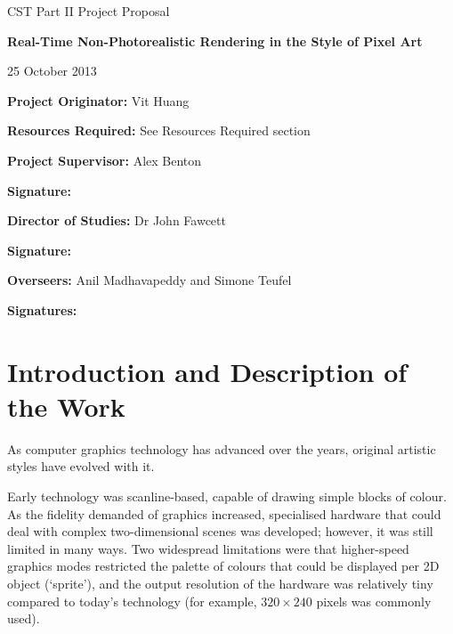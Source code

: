 \documentclass[12pt]{article}
\begin{document}
\thispagestyle{empty}

\medskip
{}
\medskip
{}

\vfil

\centerline{\large CST Part II Project Proposal}
\vspace{0.4in}
\centerline{\Large\bf Real-Time Non-Photorealistic Rendering in the Style of Pixel Art}
\vspace{0.3in}
\centerline{\large 25 October 2013}

\vfil

{\bf Project Originator:} Vit Huang

\vspace{0.1in}

{\bf Resources Required:} See Resources Required section

\vspace{0.5in}

{\bf Project Supervisor:} Alex Benton

\vspace{0.2in}

{\bf Signature:}

\vspace{0.5in}

{\bf Director of Studies:} Dr John Fawcett

\vspace{0.2in}

{\bf Signature:}

\vspace{0.5in}

{\bf Overseers:} Anil Madhavapeddy and Simone Teufel

\vspace{0.2in}

{\bf Signatures:}

\vfil
\eject


\section*{Introduction and Description of the Work}

As computer graphics technology has advanced over the years, original artistic styles have evolved with it.

Early technology was scanline-based, capable of drawing simple blocks of colour. As the fidelity demanded of graphics increased, specialised hardware that could deal with complex two-dimensional scenes was developed; however, it was still limited in many ways. Two widespread limitations were that higher-speed graphics modes restricted the palette of colours that could be displayed per 2D object (`sprite'), and the output resolution of the hardware was relatively tiny compared to today's technology (for example, $320\times240$ pixels was commonly used).
\end{document}
